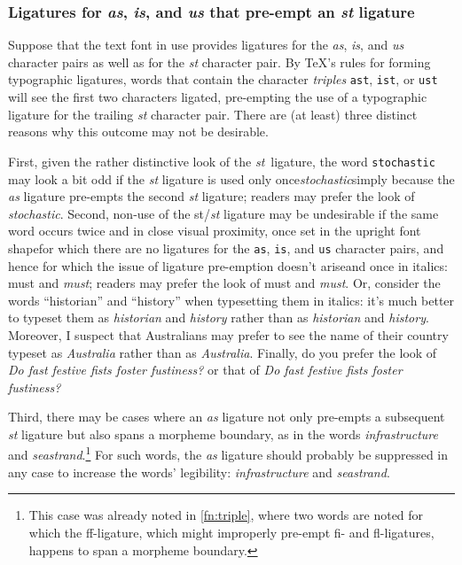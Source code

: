 \documentclass[11pt]{article}
\newcommand{\opt}[1]{\texttt{#1}}
\begin{document}
\subsubsection*{Ligatures for \emph{as}, \emph{is}, and \emph{us} that pre-empt an \emph{st} ligature}

Suppose that the text font in use provides ligatures for the \emph{as}, \emph{is}, and \emph{us} character pairs as well as for the \emph{st} character pair. By \TeX's rules for forming typographic ligatures, words that contain the character \emph{triples} \opt{ast}, \opt{ist}, or \opt{ust} will see the first two characters ligated, pre-empting the use of a typographic ligature for the trailing \emph{st} character pair. There are (at least) three distinct reasons why this outcome may not be desirable.

First, given the rather distinctive look of the \emph{st}~ligature, the word \opt{stochastic} may look a bit odd if the \emph{st} ligature is used only once\textemdash\emph{stoch\mbox{as}tic}\textemdash simply because the \emph{as} ligature pre-empts the second \emph{st} ligature; readers may prefer the look of \emph{stocha\mbox{st}ic}. Second, non-use of the st/\emph{st} ligature may be undesirable if the same word occurs twice and in close visual proximity, once set in the upright font shape\textemdash for which there are no ligatures for the \opt{as}, \opt{is}, and \opt{us} character pairs, and hence for which the issue of ligature pre-emption doesn't arise\textemdash and once in italics: must and \emph{m\mbox{us}t}; readers may prefer the look of must and \emph{mu\mbox{st}}. Or, consider the words \enquote{historian} and \enquote{history} when typesetting them in italics: it's much better to typeset them as \emph{historian} and \emph{history} rather than as \emph{h\mbox{is}torian} and \emph{h\mbox{is}tory}. Moreover, I suspect that Australians may prefer to see the name of their country typeset as \emph{Australia} rather than as \emph{A\mbox{us}tralia}. Finally, do you prefer the look of \emph{Do f\mbox{as}t festive f\mbox{is}ts foster f\mbox{us}tiness?} or that of \emph{Do fa\mbox{st} festive fi\mbox{st}s foster fu\mbox{st}iness?}

Third, there may be cases where an \emph{as} ligature not only pre-empts a subsequent \emph{st} ligature but also spans a morpheme boundary, as in the words \emph{infr\mbox{as}tructure} and \emph{se\mbox{as}trand}.\footnote{This case was already noted in \cref{fn:triple}, where two words are noted for which the ff-ligature, which might improperly pre-empt fi- and fl-ligatures, happens to span a morpheme boundary.} For such words, the \emph{as} ligature should probably be suppressed in any case to increase the words' legibility: \emph{infra\mbox{st}ructure} and \emph{sea\mbox{st}rand}.
\end{document}
